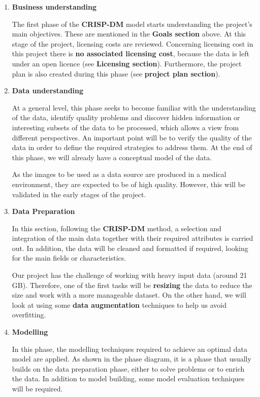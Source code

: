 \begin{enumerate}
    \item \textbf{Business understanding}
    
    The first phase of the \textbf{CRISP-DM} model starts understanding the project's main objectives. These are mentioned in the \textbf{ Goals section} above. At this stage of the project, licensing costs are reviewed. Concerning licensing cost in this project there is \textbf{no associated licensing cost}, because the data is left under an open licence (see \textbf{Licensing section}). Furthermore, the project plan is also created during this phase (see \textbf{project plan section}).
    \item \textbf{Data understanding}
    
    At a general level, this phase seeks to become familiar with the understanding of the data, identify quality problems and discover hidden information or interesting subsets of the data to be processed, which allows a view from different perspectives. An important point will be to verify the quality of the data in order to define the required strategies to address them. At the end of this phase, we will already have a conceptual model of the data.

    As the images to be used as a data source are produced in a medical environment, they are expected to be of high quality. However, this will be validated in the early stages of the project.

        
    \item \textbf{Data Preparation}

    In this section, following the \textbf{CRISP-DM} method, a selection and integration of the main data together with their required attributes is carried out. In addition, the data will be cleaned and formatted if required, looking for the main fields or characteristics.

    Our project has the challenge of working with heavy input data (around 21 GB). Therefore, one of the first tasks will be \textbf{resizing} the data to reduce the size and work with a more manageable dataset. On the other hand, we will look at using some \textbf{data augmentation} techniques to help us avoid overfitting. 
    
    \item \textbf{Modelling}

    In this phase, the modelling techniques required to achieve an optimal data model are applied. As shown in the phase diagram, it is a phase that usually builds on the data preparation phase, either to solve problems or to enrich the data. In addition to model building, some model evaluation techniques will be required.


\end{enumerate}
